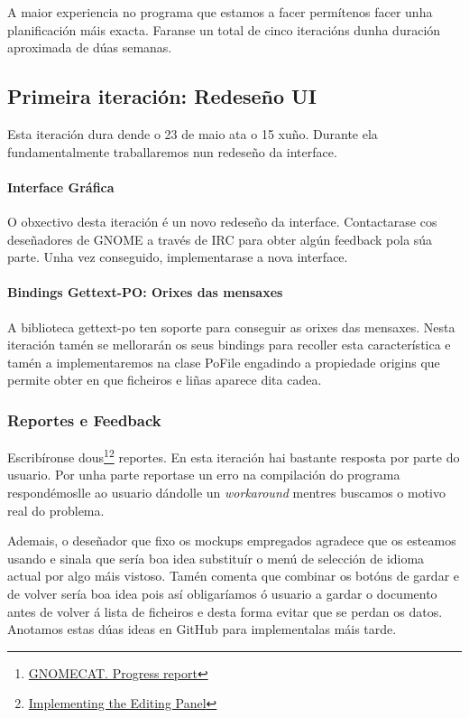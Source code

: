 A maior experiencia no programa que estamos a facer permítenos facer unha planificación máis exacta. Faranse un total de cinco iteracións dunha duración aproximada de dúas semanas.

\subsection{Primeira iteración: Redeseño UI}

Esta iteración dura dende o 23 de maio ata o 15 xuño. Durante ela fundamentalmente traballaremos nun redeseño da interface.

\paragraph{Interface Gráfica} O obxectivo desta iteración é un novo redeseño da interface. Contactarase cos deseñadores de GNOME a través de IRC para obter algún feedback pola súa parte. Unha vez conseguido, implementarase a nova interface.

\paragraph{Bindings Gettext-PO: Orixes das mensaxes}
A biblioteca gettext-po ten soporte para conseguir as orixes das mensaxes. Nesta iteración tamén se mellorarán os seus bindings para recoller esta característica e tamén a implementaremos na clase PoFile engadindo a propiedade origins que permite obter en que ficheiros e liñas aparece dita cadea.

\subsubsection{Reportes e Feedback}
Escribíronse dous\footnote{\href{http://aquelando.info/gnomecat-progress-report/}{GNOMECAT. Progress report}}\footnote{\href{http://aquelando.info/implementing-the-editing-panel/}{Implementing the Editing Panel}} reportes. En esta iteración hai bastante resposta por parte do usuario. Por unha parte reportase un erro na compilación do programa respondémoslle ao usuario dándolle un \emph{workaround} mentres buscamos o motivo real do problema.

Ademais, o deseñador que fixo os mockups empregados agradece que os esteamos usando e sinala que sería boa idea substituír o menú de selección de idioma actual por algo máis vistoso. Tamén comenta que combinar os botóns de gardar e de volver sería boa idea pois así obligaríamos ó usuario a gardar o documento antes de volver á lista de ficheiros e desta forma evitar que se perdan os datos. Anotamos estas dúas ideas en GitHub para implementalas máis tarde.

